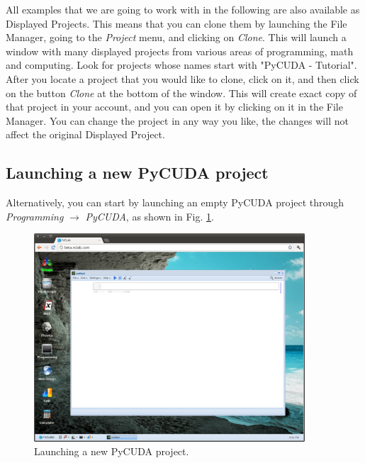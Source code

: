 \documentclass{article}
\begin{document}
All examples that we are going to work with in the following are also available 
as Displayed Projects. This means that you can clone them by launching the File
Manager, going to the {\em Project} menu, and clicking on {\em Clone}. This will launch 
a window with many displayed projects from various areas of programming,
math and computing. Look for projects whose names start with "PyCUDA - Tutorial".
After you locate a project that you would like to clone, click on it,
and then click on the button {\em Clone} at the bottom of the window. This will
create exact copy of that project in your account, and you can open it 
by clicking on it in the File Manager. You can change the project in any way 
you like, the changes will not affect the original Displayed Project. 


\subsection{Launching a new PyCUDA project}

Alternatively, you can start by launching an empty PyCUDA project through 
{\em Programming} $\rightarrow$ {\em PyCUDA}, as shown in Fig. \ref{fig:pycuda}.

\newpage


\begin{figure}[!ht]
\begin{center}
\includegraphics[width=0.9\textwidth]{img/pycuda.png}
\end{center}
\caption{Launching a new PyCUDA project.}
\label{fig:pycuda}
\end{figure}
\noindent
\end{document}
